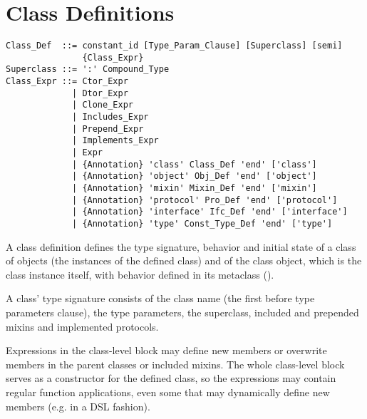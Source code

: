 \section{Class Definitions}
\label{sec:class-definitions}

\syntax\begin{lstlisting}
Class_Def  ::= constant_id [Type_Param_Clause] [Superclass] [semi]
               {Class_Expr}
Superclass ::= ':' Compound_Type
Class_Expr ::= Ctor_Expr
             | Dtor_Expr
             | Clone_Expr
             | Includes_Expr
             | Prepend_Expr
             | Implements_Expr
             | Expr
             | {Annotation} 'class' Class_Def 'end' ['class']
             | {Annotation} 'object' Obj_Def 'end' ['object']
             | {Annotation} 'mixin' Mixin_Def 'end' ['mixin']
             | {Annotation} 'protocol' Pro_Def 'end' ['protocol']
             | {Annotation} 'interface' Ifc_Def 'end' ['interface']
             | {Annotation} 'type' Const_Type_Def 'end' ['type']
\end{lstlisting}

A class definition defines the type signature, behavior and initial state of a class of objects (the instances of the defined class) and of the class object, which is the class instance itself, with behavior defined in its metaclass (). 

A class' type signature consists of the class name (the first  before type parameters clause), the type parameters, the superclass, included and prepended mixins and implemented protocols. 

Expressions in the class-level block may define new members or overwrite members in the parent classes or included mixins. The whole class-level block serves as a constructor for the defined class, so the expressions may contain regular function applications, even some that may dynamically define new members (e.g. in a DSL fashion). 

